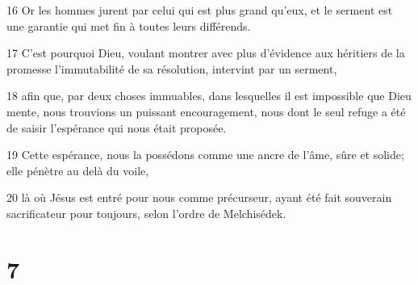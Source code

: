 \par 16 Or les hommes jurent par celui qui est plus grand qu'eux, et le serment est une garantie qui met fin à toutes leurs différends.
\par 17 C'est pourquoi Dieu, voulant montrer avec plus d'évidence aux héritiers de la promesse l'immutabilité de sa résolution, intervint par un serment,
\par 18 afin que, par deux choses immuables, dans lesquelles il est impossible que Dieu mente, nous trouvions un puissant encouragement, nous dont le seul refuge a été de saisir l'espérance qui nous était proposée.
\par 19 Cette espérance, nous la possédons comme une ancre de l'âme, sûre et solide; elle pénètre au delà du voile,
\par 20 là où Jésus est entré pour nous comme précurseur, ayant été fait souverain sacrificateur pour toujours, selon l'ordre de Melchisédek.

\chapter{7}

